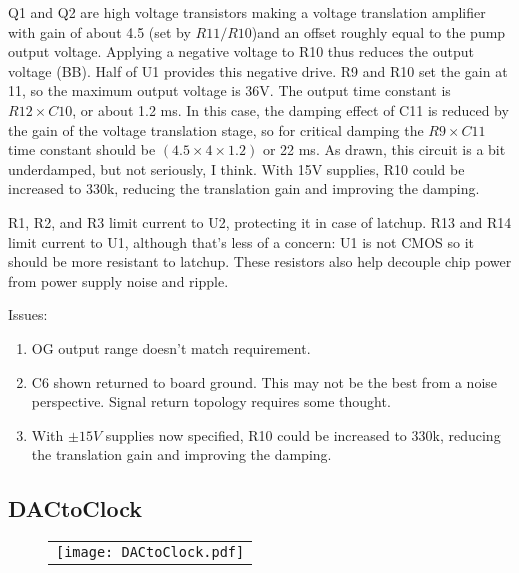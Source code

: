 \documentclass[a4paper,12pt]{article}
\begin{document}
Q1 and Q2 are high voltage transistors making a voltage translation amplifier with gain of about 4.5 (set by $R11/R10$)and an offset roughly equal to the pump output voltage. Applying a negative voltage to R10 thus reduces the output voltage (BB). Half of U1 provides this negative drive. R9 and R10 set the gain at 11, so the maximum output voltage is 36V. The output time constant is $R12\times C10$, or about 1.2 ms. In this case, the damping effect of C11 is reduced by the gain of the voltage translation stage, so for critical damping the $R9\times C11$ time constant should be $(4.5\times4\times1.2)$ or 22 ms. As drawn, this circuit is a bit underdamped, but not seriously, I think. With 15V supplies, R10 could be increased to 330k, reducing the translation gain and improving the damping.

R1, R2, and R3 limit current to U2, protecting it in case of latchup. R13 and R14 limit current to U1, although that's less of a concern: U1 is not CMOS so it should be more resistant to latchup. These resistors also help decouple chip power from power supply noise and ripple.

Issues:
\begin{enumerate}
\item
OG output range doesn't match requirement.
\item
C6 shown returned to board ground. This may not be the best from a noise perspective. Signal return topology requires some thought.
\item
With $\pm15V$ supplies now specified, R10 could be increased to 330k, reducing the translation gain and improving the damping.
\end{enumerate}

\subsection{DACtoClock}

   \begin{figure}
   \begin{center}
   \begin{tabular}{c}
   \texttt{[image: DACtoClock.pdf]}
   \end{tabular}
   \end{center}
   \end{figure}

\end{document}
